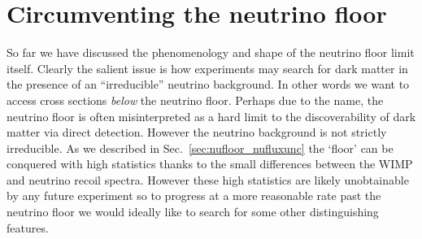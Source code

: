 \section{Circumventing the neutrino floor}\label{sec:nufloor_time}
So far we have discussed the phenomenology and shape of the neutrino floor limit itself. Clearly the salient issue is how experiments may search for dark matter in the presence of an ``irreducible'' neutrino background. In other words we want to access cross sections {\it below} the neutrino floor. Perhaps due to the name, the neutrino floor is often misinterpreted as a hard limit to the discoverability of dark matter via direct detection. However the neutrino background is not strictly irreducible. As we described in Sec.~\ref{sec:nufloor_nufluxunc} the `floor' can be conquered with high statistics thanks to the small differences between the WIMP and neutrino recoil spectra. However these high statistics are likely unobtainable by any future experiment so to progress at a more reasonable rate past the neutrino floor we would ideally like to search for some other distinguishing features.

